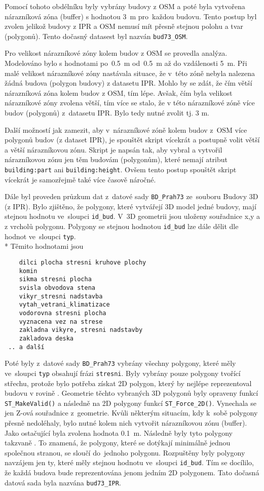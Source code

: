 Pomocí tohoto obdélníku byly vybrány budovy z OSM a poté byla vytvořena nárazníková zóna (buffer) s hodnotou
3~m pro~každou budovu. Tento postup byl zvolen jelikož budovy z IPR a
OSM nemusí mít přesně stejnou polohu a tvar (polygonů). Tento dočasný
datasest byl nazván {\tt bud73\_OSM}.

Pro velikost nárazníkové zóny kolem budov z OSM se provedla analýza.
Modelováno bylo s hodnotami po~0.5~m od~0.5~m až do vzdálenosti 5~m.
Při malé velikost nárazníkové zóny nastávala situace, že v~této zóně
nebyla nalezena žádná budova (polygon budovy) z datasetu IPR. Mohlo by
se zdát, že čím větší nárazníková zóna kolem budov z OSM, tím lépe.
Avšak, čím byla velikost nárazníkové zóny zvolena větší, tím více se
stalo, že v této nárazníkové zóně  více budov (polygonů)
z~datasetu IPR. Bylo tedy nutné zvolit  tj. 3 m.

Další možností jak zamezit, aby v~nárazníkové zóně kolem budov
z~OSM  více polygonů budov (z dataset IPR), je spouštět skript
vícekrát a postupně volit větší a větší nárazníkovou zónu. Skript je
napsán tak, aby vybral a vytvořil nárazníkovou zónu jen těm budovám
(polygonům), které nemají atribut {\tt building:part} ani
{\tt building:height}. Ovšem tento postup spouštět skript vícekrát je
samozřejmě také více časově náročné.

Dále byl proveden průzkum dat z~datové sady {\tt BD\_Prah73} 
ze~souboru Budovy 3D (z IPR). Bylo zjištěno, že polygony, které
vytvářejí 3D model jedné budovy, mají stejnou hodnotu ve~sloupci
{\tt id\_bud}. V~3D geometrii jsou uloženy  souřadnice
x,y a z vrcholů polygonu. Polygony se
stejnou hodnotou {\tt id\_bud} lze dále dělit dle hodnot
ve~sloupci {\tt typ}.
\\*
Těmito hodnotami jsou
\begin{verbatim}
    dilci plocha stresni kruhove plochy
    komin
    sikma stresni plocha
    svisla obvodova stena
    vikyr_stresni nadstavba
    vytah_vetrani_klimatizace
    vodorovna stresni plocha
    vyznacena vez na strese
    zakladna vikyre, stresni nadstavby
    zakladova deska
 .. a další
\end{verbatim}

Poté byly z~datové sady {\tt BD\_Prah73} vybrány všechny polygony,
které měly ve~sloupci {\tt typ} obsahují frázi {\tt stresni}.
Byly vybrány pouze polygony tvořící střechu,
protože bylo potřeba získat 2D polygon, který by nejlépe reprezentoval budovu v rovině .
Geometrie těchto vybraných 3D polygonů byly opraveny funkcí
{\tt ST\_MakeValid()} a následně  na 2D polygony funkcí
{\tt ST\_Force\_2D()}. Vynechala se jen Z-ová souřadnice z~geometrie.
Kvůli některým situacím, kdy k~sobě polygony přesně nedoléhaly, bylo
nutné kolem nich vytvořit nárazníkovou zónu (buffer). Jako ostačující
byla zvolena hodnota 0.1~m. Následně byly tyto polygony takzvaně
. To znamená, že polygony, které se dotýkají
minimálně jednou společnou stranou, se sloučí do~jednoho polygonu.
Rozpuštěny byly polygony navzájem jen ty, které měly stejnou hodnotu
ve~sloupci {\tt id\_bud}. Tím se docílilo, že každá budova bude
reprezentována jenom jedním 2D polygonem. Tato dočasná datová sada
byla nazvána {\tt bud73\_IPR}.


